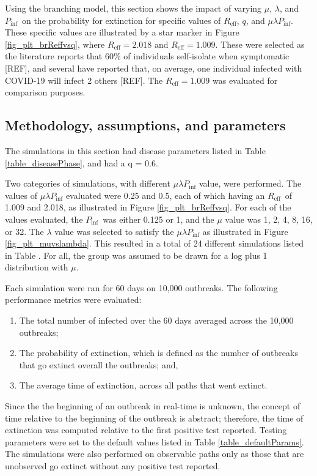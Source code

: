 \documentclass[sr]{drdc-report}
\def\Reff{\ensuremath{R_\mathrm{eff}}}
\def\Pinf{\ensuremath{P_\mathrm{inf}}}
\begin{document}
Using the branching model, this section shows the impact of varying $\mu$, $\lambda$, and \Pinf\ on the probability for extinction for specific values of \Reff, $q$, and  $\mu\lambda\Pinf$. These specific values are illustrated by a star marker in Figure \ref{fig_plt_brReffvsq}, where $\Reff = 2.018$ and $\Reff = 1.009$. These were selected as the literature reports that 60\% of individuals self-isolate when symptomatic [REF], and several have reported that, on average, one individual infected with COVID-19 will infect 2 others [REF]. The $\Reff = 1.009$ was evaluated for comparison purposes.
 
\subsection{Methodology, assumptions, and parameters} 

The simulations in this section had disease parameters listed in Table \ref{table_diseasePhase}, and had a q = 0.6.  

Two categories of simulations, with different $\mu\lambda\Pinf$ value, were performed. The values of $\mu\lambda\Pinf$ evaluated were 0.25 and 0.5, each of which having an \Reff\ of 1.009 and 2.018, as illustrated in Figure \ref{fig_plt_brReffvsq}. For each of the values evaluated, the \Pinf\ was either 0.125 or 1, and the $\mu$ value was 1, 2, 4, 8, 16, or 32. The $\lambda$ value was selected to satisfy the $\mu\lambda\Pinf$ as illustrated in Figure \ref{fig_plt_muvslambda}. This resulted in a total of 24 different simulations listed in Table \label{table_simIparams}. For all, the group was assumed to be drawn for a log plus 1 distribution with $\mu$. 

Each simulation were ran for 60 days on 10,000 outbreaks. The following performance metrics were evaluated:

\begin{enumerate}
\item The total number of infected over the 60 days averaged across the 10,000 outbreaks;
\item The probability of extinction, which is defined as the number of outbreaks that go extinct overall the outbreaks; and,
\item The average time of extinction, across all paths that went extinct. 
\end{enumerate}

Since the the beginning of an outbreak in real-time is unknown, the concept of time relative to the beginning of the outbreak is abstract; therefore, the time of extinction was computed relative to the first positive test reported. Testing parameters were set to the default values listed in Table \ref{table_defaultParams}. The simulations were also performed on observable paths only as those that are unobserved go extinct without any positive test reported. 
\end{document}
